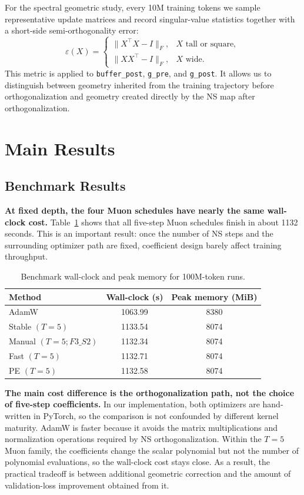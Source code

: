 \documentclass[10pt]{article}
\begin{document}
For the spectral geometric study, every 10M training tokens we sample representative update matrices and record singular-value statistics together with a short-side semi-orthogonality error:
\begin{equation}
    \varepsilon(X)=
    \begin{cases}
        \lVert X^\top X-I\rVert_F, & X \text{ tall or square},\\
        \lVert X X^\top-I\rVert_F, & X \text{ wide}.
    \end{cases}
\end{equation}
This metric is applied to \texttt{buffer\_post}, \texttt{g\_pre}, and \texttt{g\_post}. It allows us to distinguish between geometry inherited from the training trajectory before orthogonalization and geometry created directly by the NS map after orthogonalization.


\section{Main Results}

\subsection{Benchmark Results}

\textbf{At fixed depth, the four Muon schedules have nearly the same wall-clock cost.} Table~\ref{tab:bench} shows that all five-step Muon schedules finish in about 1132 seconds. This is an important result: once the number of NS steps and the surrounding optimizer path are fixed, coefficient design barely affect training throughput.

\begin{table}[h]
\centering
\caption{Benchmark wall-clock and peak memory for 100M-token runs.}
\label{tab:bench}
\small
\begin{tabular}{lcc}
\toprule
Method & Wall-clock (s) & Peak memory (MiB) \\
\midrule
AdamW & 1063.99 & 8380 \\
Stable $(T=5)$ & 1133.54 & 8074 \\
Manual $(T=5;F3\_S2)$ & 1132.34 & 8074 \\
Fast $(T=5)$ & 1132.71& 8074 \\
PE $(T=5)$ & 1132.58 & 8074 \\
\bottomrule
\end{tabular}
\end{table}

\textbf{The main cost difference is the orthogonalization path, not the choice of five-step coefficients.} In our implementation, both optimizers are hand-written in PyTorch, so the comparison is not confounded by different kernel maturity. AdamW is faster because it avoids the matrix multiplications and normalization operations required by NS orthogonalization. Within the $T=5$ Muon family, the coefficients change the scalar polynomial but not the number of polynomial evaluations, so the wall-clock cost stays close. As a result, the practical tradeoff is between additional geometric correction and the amount of validation-loss improvement obtained from it.
\end{document}
